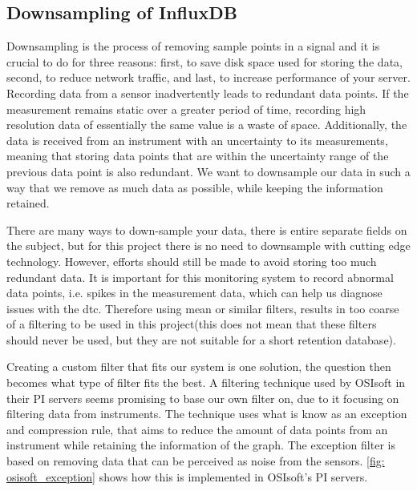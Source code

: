 \documentclass[main.tex]{subfiles}
\begin{document}
 
 
 \subsection{Downsampling of InfluxDB}
 \label{ssec: downsampling}

 Downsampling is the process of removing sample points in a signal and it is crucial to do for three reasons: first, to save disk space used for storing the data, second, to reduce network traffic, and last, to increase performance of your server. Recording data from a sensor inadvertently leads to redundant data points. If the measurement remains static over a greater period of time, recording high resolution data of essentially the same value is a waste of space. Additionally, the data is received from an instrument with an uncertainty to its measurements, meaning that storing data points that are within the uncertainty range of the previous data point is also redundant. We want to downsample our data in such a way that we remove as much data as possible, while keeping the information retained.
 
 There are many ways to down-sample your data, there is entire separate fields on the subject, but for this project there is no need to downsample with cutting edge technology. However, efforts should still be made to avoid storing too much redundant data. It is important for this monitoring system to record abnormal data points, i.e. spikes in the measurement data, which can help us diagnose issues with the \gls{dtc}. Therefore using mean or similar filters, results in too coarse of a filtering to be used in this project(this does not mean that these filters should never be used, but they are not suitable for a short retention database).
 
 Creating a custom filter that fits our system is one solution, the question then becomes what type of filter fits the best. A filtering technique used by OSIsoft in their PI servers seems promising to base our own filter on, due to it focusing on filtering data from instruments. The technique uses what is know as an exception and compression rule, that aims to reduce the amount of data points from an instrument while retaining the information of the graph. The exception filter is based on removing data that can be perceived as noise from the sensors\cite{osisoft_exception}. \autoref{fig: osisoft_exception} shows how this is implemented in OSIsoft's PI servers.
 
\end{document}
